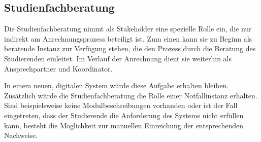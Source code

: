\subsection{Studienfachberatung}

Die Studienfachberatung nimmt als Stakeholder eine spezielle Rolle ein, die nur indirekt am Anrechnungsprozess beteiligt ist. Zum einen kann sie zu Beginn als beratende Instanz zur Verfügung stehen, die den Prozess durch die Beratung des Studierenden einleitet. 
Im Verlauf der Anrechnung dient sie weiterhin als Ansprechpartner und Koordinator.

In einem neuen, digitalen System würde diese Aufgabe erhalten bleiben. Zusätzlich würde die Studienfachberatung die Rolle einer Notfallinstanz erhalten. Sind beispielsweise keine Modulbeschreibungen vorhanden oder ist der Fall eingetreten, dass der Studierende die Anforderung des Systems nicht erfüllen kann, besteht die Möglichkeit zur manuellen Einreichung der entsprechenden Nachweise. 
